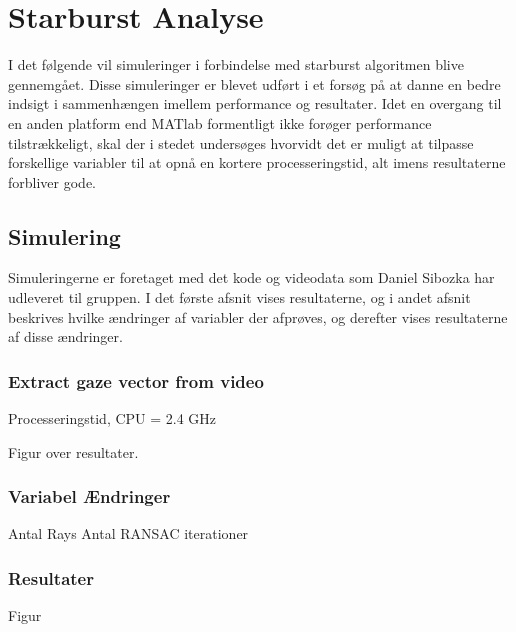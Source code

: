 \documentclass[analyse.tex]{subfiles}
\begin{document}
\section{Starburst Analyse}
I det følgende vil simuleringer i forbindelse med starburst algoritmen blive gennemgået. Disse simuleringer er blevet udført i et forsøg på at danne en bedre indsigt i sammenhængen imellem performance og resultater. Idet en overgang til en anden platform end MATlab formentligt ikke forøger performance tilstrækkeligt, skal der i stedet undersøges hvorvidt det er muligt at tilpasse forskellige variabler til at opnå en kortere processeringstid, alt imens resultaterne forbliver gode.
	
\subsection{Simulering}

Simuleringerne er foretaget med det kode og videodata som Daniel Sibozka har udleveret til gruppen. I det første afsnit vises resultaterne, og i andet afsnit beskrives hvilke ændringer af variabler der afprøves, og derefter vises resultaterne af disse ændringer.

\subsubsection{Extract gaze vector from video}

Processeringstid, CPU = 2.4 GHz

Figur over resultater.

\subsubsection{Variabel Ændringer}

Antal Rays
Antal RANSAC iterationer


\subsubsection{Resultater}

Figur 
\end{document}
